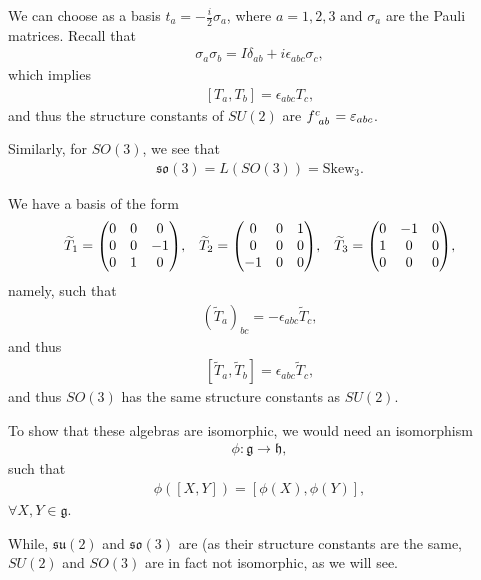 We can choose as a basis $t_{a} = -\frac{i}{2} \sigma_a$, where $a = 1,2,3$ and $\sigma_a$ are the Pauli matrices. Recall that
\begin{align}
    \sigma_a \sigma_b = I \delta_{ab} + i \epsilon_{abc} \sigma_c
,\end{align}
which implies
\begin{align}
    \left[ T_{a}, T_{b} \right] = \epsilon_{abc} T_c
,\end{align}
and thus the structure constants of $SU \left( 2 \right) $ are $\tensor{f}{^{c}_{ab}} = \epsilon_{abc}$.

Similarly, for $SO \left( 3 \right) $, we see that
\begin{align}
    \mathfrak{so}\left( 3 \right) = L \left( SO \left( 3 \right)  \right) = \text{Skew}_3
.\end{align}

We have a basis of the form
\begin{align}
    \widetilde{T}_1 = \mqty( 0 & 0 & 0 \\ 0 & 0 & -1 \\ 0 & 1 & 0 ), && \widetilde{T}_2 = \mqty( 0 & 0 & 1 \\ 0 & 0 & 0 \\ -1 & 0 & 0), && \widetilde{T}_3 = \mqty( 0 & -1 & 0 \\ 1 & 0 & 0 \\ 0 & 0 & 0)
,\end{align}
namely, such that
\begin{align}
    \left( \widetilde{T}_a \right)_{bc} = -\epsilon_{abc} \widetilde{T}_{c}
,\end{align}
and thus 
\begin{align}
    \left[ \widetilde{T}_{a}, \widetilde{T}_b \right] = \epsilon_{abc} \widetilde{T}_c
,\end{align}
and thus $SO \left( 3 \right) $ has the same structure constants as $SU \left( 2 \right) $.

To show that these algebras are isomorphic, we would need an isomorphism
\begin{align}
    \phi : \mathfrak{g} \to \mathfrak{h}
,\end{align}
such that
\begin{align}
    \phi \left( \left[ X, Y \right]  \right) = \left[ \phi \left( X \right) , \phi \left( Y \right)  \right] 
,\end{align}
$\forall X,Y \in \mathfrak{g}$.

While, $\mathfrak{su}\left( 2 \right) $ and $\mathfrak{so}\left( 3 \right) $ are (as their structure constants are the same, $SU \left( 2 \right) $ and $SO \left( 3 \right) $ are in fact not isomorphic, as we will see.

